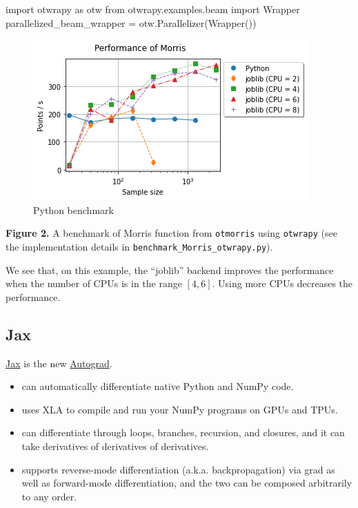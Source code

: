 \documentclass[11pt]{article}
\providecommand{\tightlist}{%
      \setlength{\itemsep}{0pt}\setlength{\parskip}{0pt}}
\newenvironment{Shaded}{}{}
\newcommand{\NormalTok}[1]{{#1}}
\newcommand{\ImportTok}[1]{{#1}}
\newcommand{\OperatorTok}[1]{\textcolor[rgb]{0.40,0.40,0.40}{{#1}}}
\begin{document}
\begin{Shaded}
\begin{Highlighting}[]
\ImportTok{import}\NormalTok{ otwrapy }\ImportTok{as}\NormalTok{ otw}
\ImportTok{from}\NormalTok{ otwrapy.examples.beam }\ImportTok{import}\NormalTok{ Wrapper}
\NormalTok{parallelized\_beam\_wrapper }\OperatorTok{=}\NormalTok{ otw.Parallelizer(Wrapper())}
\end{Highlighting}
\end{Shaded}

    \begin{figure}
\centering
\includegraphics{benchmark_Morris_otwrapy.png}
\caption{Python benchmark}
\end{figure}

\textbf{Figure 2.} A benchmark of Morris function from \texttt{otmorris}
using \texttt{otwrapy} (see the implementation details in \texttt{benchmark\_Morris\_otwrapy.py}).

We see that, on this example, the ``joblib'' backend improves the
performance when the number of CPUs is in the range \([4, 6]\). Using
more CPUs decreases the performance.

    \hypertarget{jax}{%
\subsection{Jax}\label{jax}}

\href{https://github.com/google/jax}{Jax} is the new
\href{https://github.com/HIPS/autograd}{Autograd}.

\begin{itemize}
\tightlist
\item
  can automatically differentiate native Python and NumPy code.
\item
  uses XLA to compile and run your NumPy programs on GPUs and TPUs.
\item
  can differentiate through loops, branches, recursion, and closures,
  and it can take derivatives of derivatives of derivatives.
\item
  supports reverse-mode differentiation (a.k.a. backpropagation) via
  grad as well as forward-mode differentiation, and the two can be
  composed arbitrarily to any order.
\end{itemize}
\end{document}
